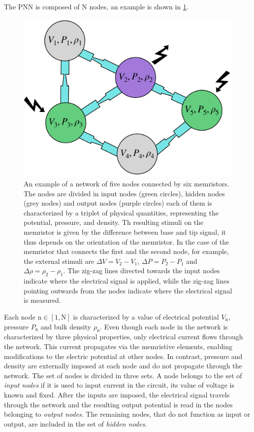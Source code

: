 \documentclass[reprint,superscriptaddress,prb,showkeys]{revtex4-2}
\newcommand{\N}{\text{N}} %
\newcommand{\n}{\text{n}} %
\begin{document}
The PNN is composed of $\N$ nodes, an example is shown in \cref{fig:memristor_network}. 
\begin{figure}[t]
    \centering
    \includegraphics[width=0.6\columnwidth]{plots/memristor/memristor_network.pdf}
    \caption{An example of a network of five nodes connected by six memristors. The nodes are divided in input nodes (green circles), hidden nodes (grey nodes) and output nodes (purple circles) each of them is characterized by a triplet of physical quantities, representing the potential, pressure, and density. Th resulting stimuli on the memristor is given by the difference between base and tip signal, it thus depends on the orientation of the memristor. In the case of the memristor that connects the first and the second node, for example, the external stimuli are $\Delta V = V_2 - V_1$, $\Delta P = P_2 - P_1$ and $\Delta \rho = \rho_2 - \rho_1$. The zig-zag lines directed towards the input nodes indicate where the electrical signal is applied, while the zig-zag lines pointing outwards from the nodes indicate where the electrical signal is measured.}
    \label{fig:memristor_network}
\end{figure} 
Each node $\n\in[1,\N]$ is characterized by a value of electrical potential $V_{\n}$, pressure $P_{\n}$ and bulk density $\rho_{\n}$. Even though each node in the network is characterized by three physical properties, only electrical current flows through the network. This current propagates via the memristive elements, enabling modifications to the electric potential at other nodes. In contrast, pressure and density are externally imposed at each node and do not propagate through the network. The set of nodes is divided in three sets. A node belongs to the set of \textit{input nodes} if it is used to input current in the circuit, its value of voltage is known and fixed. After the inputs are imposed, the electrical signal travels through the network and the resulting output potential is read in the nodes belonging to \textit{output nodes}. The remaining nodes, that do not function as input or output, are included in the set of \textit{hidden nodes}.
\end{document}
